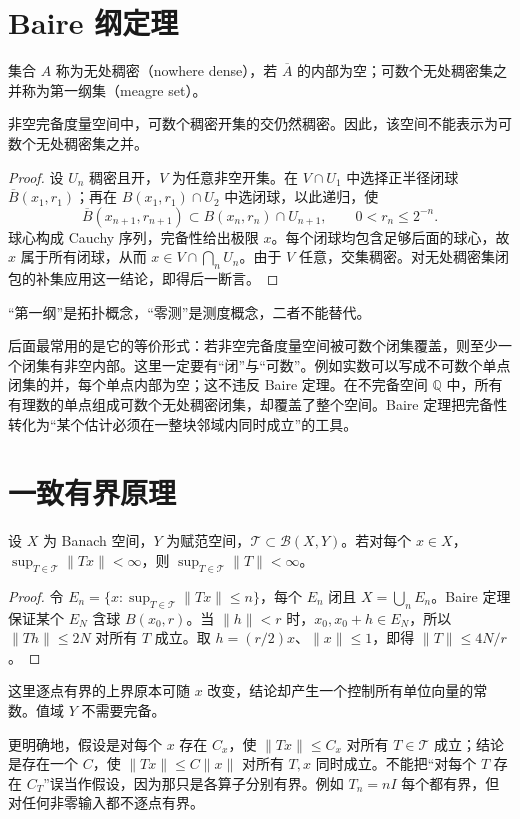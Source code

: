 \documentclass[UTF8,12pt,a4paper,fontset=fandol]{ctexbook}
\begin{document}
\section{Baire 纲定理}
集合 $A$ 称为无处稠密（nowhere dense），若 $\overline A$ 的内部为空；可数个无处稠密集之并称为第一纲集（meagre set）。
\begin{theorem}\label{thm:fa-baire}
非空完备度量空间中，可数个稠密开集的交仍然稠密。因此，该空间不能表示为可数个无处稠密集之并。
\end{theorem}
\begin{proof}
设 $U_n$ 稠密且开，$V$ 为任意非空开集。在 $V\cap U_1$ 中选择正半径闭球 $\overline B(x_1,r_1)$；再在 $B(x_1,r_1)\cap U_2$ 中选闭球，以此递归，使
\[
 \overline B(x_{n+1},r_{n+1})\subset B(x_n,r_n)\cap U_{n+1},
 \qquad0<r_n\leq2^{-n}.
\]
球心构成 Cauchy 序列，完备性给出极限 $x$。每个闭球均包含足够后面的球心，故 $x$ 属于所有闭球，从而 $x\in V\cap\bigcap_nU_n$。由于 $V$ 任意，交集稠密。对无处稠密集闭包的补集应用这一结论，即得后一断言。
\end{proof}
“第一纲”是拓扑概念，“零测”是测度概念，二者不能替代。

后面最常用的是它的等价形式：若非空完备度量空间被可数个闭集覆盖，则至少一个闭集有非空内部。这里一定要有“闭”与“可数”。例如实数可以写成不可数个单点闭集的并，每个单点内部为空；这不违反 Baire 定理。在不完备空间 $\mathbb Q$ 中，所有有理数的单点组成可数个无处稠密闭集，却覆盖了整个空间。Baire 定理把完备性转化为“某个估计必须在一整块邻域内同时成立”的工具。

\section{一致有界原理}
\begin{theorem}\label{thm:fa-uniform-boundedness}
设 $X$ 为 Banach 空间，$Y$ 为赋范空间，$\mathcal T\subset\mathcal B(X,Y)$。若对每个 $x\in X$，$\sup_{T\in\mathcal T}\|Tx\|<\infty$，则 $\sup_{T\in\mathcal T}\|T\|<\infty$。
\end{theorem}
\begin{proof}
令 $E_n=\{x:\sup_{T\in\mathcal T}\|Tx\|\leq n\}$，每个 $E_n$ 闭且 $X=\bigcup_nE_n$。Baire 定理保证某个 $E_N$ 含球 $B(x_0,r)$。当 $\|h\|<r$ 时，$x_0,x_0+h\in E_N$，所以 $\|Th\|\leq2N$ 对所有 $T$ 成立。取 $h=(r/2)x$、$\|x\|\leq1$，即得 $\|T\|\leq4N/r$。
\end{proof}
这里逐点有界的上界原本可随 $x$ 改变，结论却产生一个控制所有单位向量的常数。值域 $Y$ 不需要完备。

更明确地，假设是对每个 $x$ 存在 $C_x$，使 $\|Tx\|\leq C_x$ 对所有 $T\in\mathcal T$ 成立；结论是存在一个 $C$，使 $\|Tx\|\leq C\|x\|$ 对所有 $T,x$ 同时成立。不能把“对每个 $T$ 存在 $C_T$”误当作假设，因为那只是各算子分别有界。例如 $T_n=nI$ 每个都有界，但对任何非零输入都不逐点有界。
\end{document}

